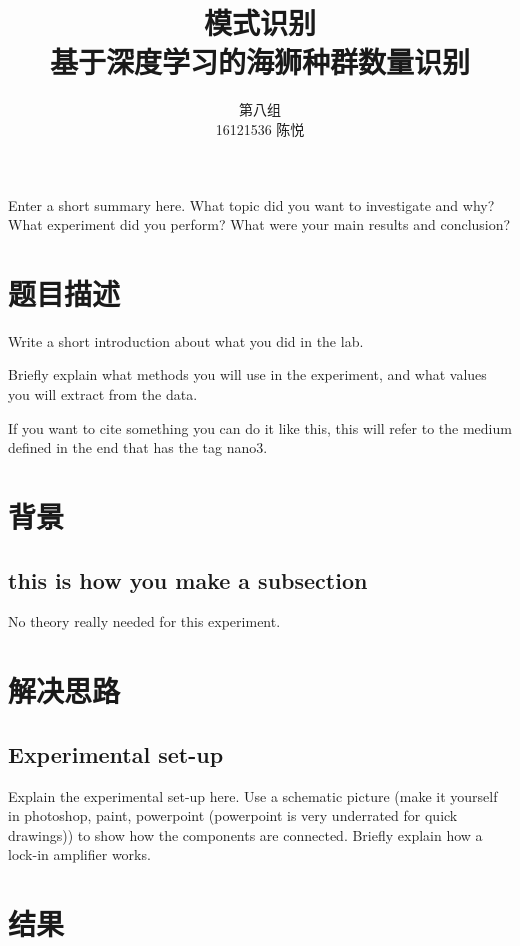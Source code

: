 \documentclass[a4paper]{article}
\title{模式识别\\基于深度学习的海狮种群数量识别}
\author{第八组\\16121536 陈悦} %
\date{}
\begin{document}
\maketitle

\tableofcontents
\thispagestyle{empty}
\newpage

\renewcommand{\abstractname}{摘要}
\thispagestyle{empty}
\begin{onecolabstract}
Enter a short summary here. What topic did you want to investigate and why? What experiment did you perform? What were your main results and conclusion?
\end{onecolabstract}
\newpage
\setcounter{page}{1}
\section{题目描述}
\label{sec:introduction}

Write a short introduction about what you did in the lab.

Briefly explain what methods you will use in the experiment, and what values you will extract from the data.

If you want to cite something you can do it like this\cite{nano3}, this will refer to the medium defined in the end that has the tag nano3.

\section{背景}
\label{sec:theory}

\subsection{this is how you make a subsection}
No theory really needed for this experiment.

\section{解决思路}

\subsection{Experimental set-up}
Explain the experimental set-up here. Use a schematic picture (make it yourself in photoshop, paint, powerpoint (powerpoint is very underrated for quick drawings)) to show how the components are connected. Briefly explain how a lock-in amplifier works.

\section{结果}
\end{document}
